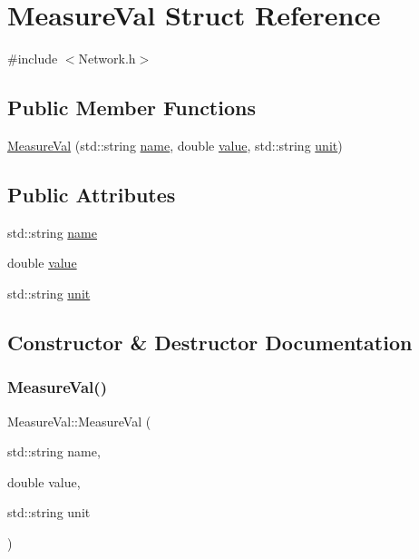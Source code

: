 \hypertarget{structMeasureVal}{}\section{Measure\+Val Struct Reference}
\label{structMeasureVal}


{\ttfamily \#include $<$Network.\+h$>$}

\subsection*{Public Member Functions}
\begin{DoxyCompactItemize}
\item 
\hyperlink{structMeasureVal_af434710f33a0b5748412467db8cd2c78}{Measure\+Val} (std\+::string \hyperlink{structMeasureVal_a9f56f01e20f665558fb0fd68bd2f1dd1}{name}, double \hyperlink{structMeasureVal_a4fe869c645268312381b156ac1b42683}{value}, std\+::string \hyperlink{structMeasureVal_a1510e76f94aac1d2c563f6559cdf7fee}{unit})
\end{DoxyCompactItemize}
\subsection*{Public Attributes}
\begin{DoxyCompactItemize}
\item 
std\+::string \hyperlink{structMeasureVal_a9f56f01e20f665558fb0fd68bd2f1dd1}{name}
\item 
double \hyperlink{structMeasureVal_a4fe869c645268312381b156ac1b42683}{value}
\item 
std\+::string \hyperlink{structMeasureVal_a1510e76f94aac1d2c563f6559cdf7fee}{unit}
\end{DoxyCompactItemize}


\subsection{Constructor \& Destructor Documentation}
\mbox{\label{structMeasureVal_af434710f33a0b5748412467db8cd2c78}} 
\subsubsection{\texorpdfstring{Measure\+Val()}{MeasureVal()}}
{\footnotesize\ttfamily Measure\+Val\+::\+Measure\+Val (\begin{DoxyParamCaption}\item[{std\+::string}]{name,  }\item[{double}]{value,  }\item[{std\+::string}]{unit }\end{DoxyParamCaption})\hspace{0.3cm}{\ttfamily [inline]}}



